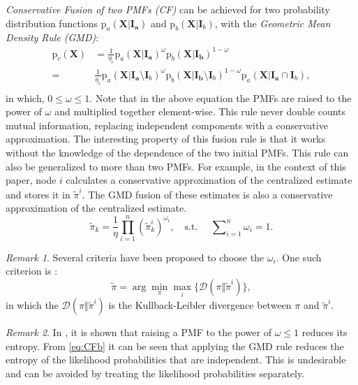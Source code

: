 \documentclass[conference]{IEEEtran}
\newcommand{\vect}[1]{{\mathbf{#1}}}
\theoremstyle{remark}
\newtheorem{remark}{Remark}
\newcommand{\pr}{\textrm{p}}
\begin{document}
\emph{Conservative Fusion of two PMFs (CF)} can be achieved for two probability distribution functions $\pr_a(\vect{X | \vect{I}_a})$ and $\pr_b(\vect{X} | \vect{I}_b)$, with the \emph{Geometric Mean Density Rule (GMD)}:
\begin{equation}
\begin{aligned}
\pr_c(\vect{X})&= \frac{1}{\eta_c} \pr_a(\vect{X| \vect{I}_a})^\omega \pr_b(\vect{X| \vect{I}_b})^{1-\omega}\\
             =& \frac{1}{\eta_c} \pr_a(\vect{X| \vect{I}_a} \setminus \vect{I}_b)^\omega \pr_b(\vect{X| \vect{I}_b} \setminus \vect{I}_b)^{1-\omega} \pr_a(\vect{X| \vect{I}_a} \cap \vect{I}_b),\\
\end{aligned}
\end{equation}  
in which, $0\leq\omega\leq1$. Note that in the above equation the PMFs are raised to the power of $\omega$ and multiplied together element-wise. This rule never double counts mutual information, replacing independent components with a conservative approximation. The interesting property of this fusion rule is that it works without the knowledge of the dependence of the two initial PMFs. This  rule can also be generalized to more than two PMFs. For example, in the context of this paper, node $i$ calculates a conservative approximation of the centralized estimate and stores it in $\tilde{\pi}^i$. The GMD fusion of these estimates is also a conservative approximation of the centralized estimate. 
\begin{equation}
			\label{eq:CFb}
		\tilde{\pi}_{k} =\frac{1}{\eta} \prod_{i=1}^{n} {(\tilde{\pi}_{k}^i)}^{\omega_i},\quad	 \text{s.t. } \quad \textstyle {\sum\nolimits_{i=1}^{n} \omega_i=1}.
\end{equation}

\normalsize
\begin{remark}
Several criteria have been proposed to choose the $\omega_i$. One such criterion is \cite{ajgl2015design}:
	\begin{equation}
	\label{eq:crit}
	 \tilde{\pi}=\arg\min_{\pi}\max_i\{\mathcal{D}(\pi\Vert \tilde{\pi}^{i})\}, \end{equation}
in which the $\mathcal{D}(\pi\Vert \tilde{\pi}^{i})$ is the Kullback-Leibler divergence between $\pi$ and $\tilde{\pi}^i$.
\end{remark}

\begin{remark}
	In \cite{bailey2012conservative}, it is shown that raising a PMF to the power of $\omega \leq 1$ reduces its entropy. From \eqref{eq:CFb} it can be seen that applying the GMD rule reduces the entropy of the likelihood probabilities that are independent. This is undesirable and can be avoided by treating the likelihood probabilities separately.
\end{remark}
\end{document}
